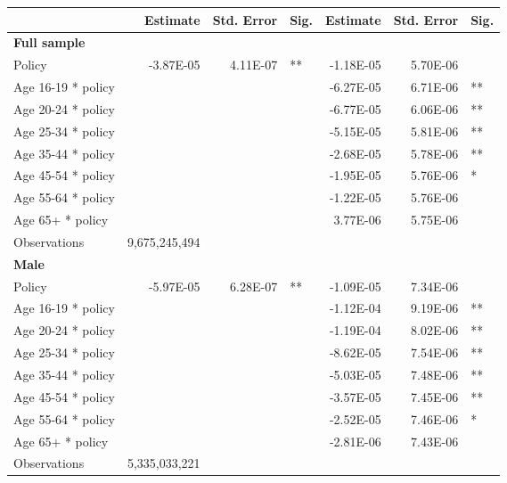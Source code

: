 
\begin{table}%
\centering 
\begin{tabular}{l r r l r r l} 

\hline 
 
 & Estimate & Std. Error & Sig. & Estimate & Std. Error & Sig. \\ 

\hline 
 
\textbf{Full sample} \\ 

Policy             &  -3.87E-05        &  4.11E-07       &   **       &  -1.18E-05        &  5.70E-06       &            \\ 
Age 16-19 * policy           & & &  &  -6.27E-05        &  6.71E-06       &   **       \\ 
Age 20-24 * policy           & & &  &  -6.77E-05        &  6.06E-06       &   **       \\ 
Age 25-34 * policy           & & &  &  -5.15E-05        &  5.81E-06       &   **       \\ 
Age 35-44 * policy           & & &  &  -2.68E-05        &  5.78E-06       &   **       \\ 
Age 45-54 * policy           & & &  &  -1.95E-05        &  5.76E-06       &    *       \\ 
Age 55-64 * policy           & & &  &  -1.22E-05        &  5.76E-06       &            \\ 
Age 65+ * policy           & & &  &  3.77E-06        &  5.75E-06       &            \\ 
Observations & 9,675,245,494 \\ 


\hline 

\textbf{Male} \\ 

Policy             &  -5.97E-05        &  6.28E-07       &   **       &  -1.09E-05        &  7.34E-06       &            \\ 
Age 16-19 * policy           & & &  &  -1.12E-04        &  9.19E-06       &   **       \\ 
Age 20-24 * policy           & & &  &  -1.19E-04        &  8.02E-06       &   **       \\ 
Age 25-34 * policy           & & &  &  -8.62E-05        &  7.54E-06       &   **       \\ 
Age 35-44 * policy           & & &  &  -5.03E-05        &  7.48E-06       &   **       \\ 
Age 45-54 * policy           & & &  &  -3.57E-05        &  7.45E-06       &   **       \\ 
Age 55-64 * policy           & & &  &  -2.52E-05        &  7.46E-06       &    *       \\ 
Age 65+ * policy           & & &  &  -2.81E-06        &  7.43E-06       &            \\ 
Observations & 5,335,033,221 \\ 



\end{tabular}
\end{table}
